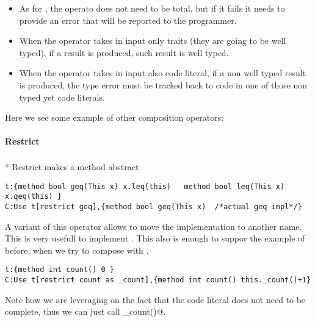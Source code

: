\begin{itemize}
\item As for \use, the operato does not need to be total, but if it fails it needs to provide an error that will be reported to the programmer.
\item When the operator takes in input only traits (they are going to be well typed), if a result is produced,
 such result is well typed.
\item When the operator takes in input also code literal, if a non well typed result is produced,
the type error must be tracked back to code in one of those non typed yet code literals.
 \end{itemize}


Here we see some example of other composition operators:
\paragraph*{Restrict}${}_{}$\\*
Restrict makes a method abstract
\begin{lstlisting}
t:{method bool geq(This x) x.leq(this)   method bool leq(This x) x.qeq(this) }
C:Use t[restrict geq],{method bool geq(This x)  /*actual geq impl*/}
\end{lstlisting}

A variant of this operator allows to move the implementation to another name. This is very usefull to implement \Q@super@. This also is enough to suppor the example of before, when we try to compose \Q@colored@
with \Q@flavoured@.

\begin{lstlisting}
t:{method int count() 0 }
C:Use t[restrict count as _count],{method int count() this._count()+1}
\end{lstlisting}
Note how we are leveraging on the fact that the code literal does not need to be complete, thus we can just call \Q@_count()@.


